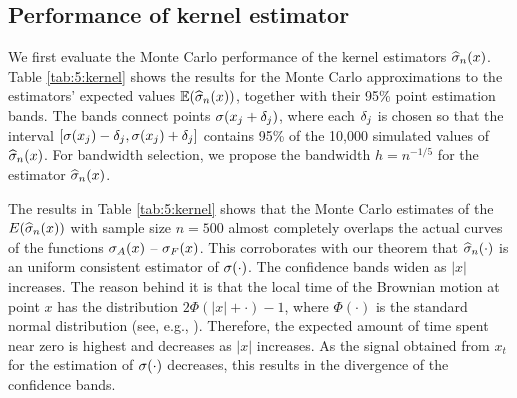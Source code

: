 \subsection{Performance of kernel estimator}
We first evaluate the Monte Carlo performance of the kernel estimators $\widehat{\sigma}_n(x)$. Table \ref{tab:5:kernel} shows the results for the Monte Carlo approximations to the estimators' expected values $\mathbb E( \widehat{\sigma}_n(x) )$, together with their 95\% point estimation bands. The bands connect points $\sigma(x_j + \delta_j)$, where each $\delta_j$ is chosen so that the interval $[ \sigma(x_j) - \delta_j, \sigma(x_j) + \delta_j ]$ contains 95\% of the 10,000 simulated values of $\widehat{\sigma}_n(x)$. For bandwidth selection, we propose the bandwidth $h = n^{-1/5}$ for the estimator $\widehat{\sigma}_n(x)$.

\begin{sidewaystable}[!ht] 
\caption{Graphs over the interval $[-10, 10]$ of $\si_A(x)$ -- $\si_F(x)$ and Monte Carlo estimates of $\E ( \widehat{\si}(x) ) $ for $h = n^{-1/5}$, with $n$ = 500.}
\label{GseqTable} 
\end{sidewaystable}

The results in Table \ref{tab:5:kernel} shows that the Monte Carlo estimates of the $E(\widehat{\sigma}_n(x))$ with sample size $n = 500$ almost completely overlaps the actual curves of the functions $\si_A(x)$ -- $\si_F(x)$. This corroborates with our theorem that $\widehat{\sigma}_n(\cdot)$ is an uniform consistent estimator of $\sigma(\cdot)$. The confidence bands widen as $|x|$ increases. The reason behind it is that the local time of the Brownian motion at point $x$ has the distribution $2\Phi(|x|+\cdot) - 1$, where $\Phi(\cdot)$ is the standard normal distribution (see, e.g., \cite{takacs1995}). Therefore, the expected amount of time spent near zero is highest and decreases as $|x|$ increases. As the signal obtained from $x_t$ for the estimation of $\sigma(\cdot)$ decreases, this results in the divergence of the confidence bands.


